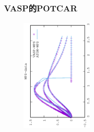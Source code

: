 \frame
{
	\frametitle{\rm{VASP}的\rm{POTCAR}}
\begin{minipage}{0.58\textwidth}
\centering
\vspace{-0.10in}
\fontsize{3.3pt}{1.9pt}\selectfont{
}
\end{minipage}
\hfill
\begin{minipage}{0.40\textwidth}
\begin{figure}[t!]
\centering
\vspace{-0.05in}
\includegraphics[height=2.25in,width=1.4in,viewport=0 0 350 550, angle=-90, clip]{Figures/WPS-data.eps}
\label{Wave-PS_Function}
\end{figure}
\end{minipage}
}

